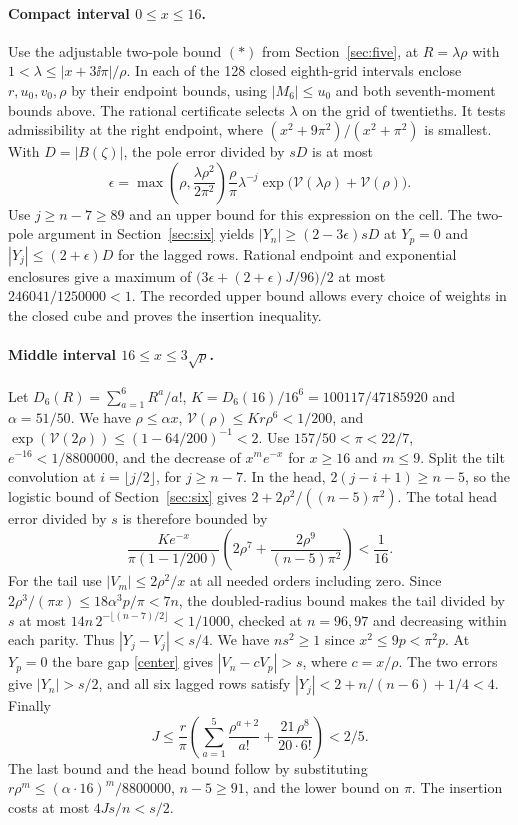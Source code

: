 \paragraph{Compact interval \(0\le x\le16\).}
Use the adjustable two-pole bound \((*)\) from Section~\ref{sec:five},
at \(R=\lambda\rho\) with \(1<\lambda\le|x+3\ii\pi|/\rho\).
In each of the 128 closed eighth-grid intervals enclose \(r,u_0,v_0,\rho\)
by their endpoint bounds, using \(|M_6|\le u_0\) and both seventh-moment
bounds above. The rational certificate selects \(\lambda\) on the
grid of twentieths. It tests admissibility at the right endpoint,
where \((x^2+9\pi^2)/(x^2+\pi^2)\) is smallest. With \(D=|B(\zeta)|\),
the pole error divided by \(sD\) is at most
\[
 \epsilon=\max\!\left(\rho,\frac{\lambda\rho^2}{2\pi^2}\right)
 \frac{\rho}{\pi}\lambda^{-j}
 \exp\!\bigl(\mathcal V(\lambda\rho)+\mathcal V(\rho)\bigr).
\]
Use \(j\ge n-7\ge89\) and an upper bound for this expression on the cell.
The two-pole argument in Section~\ref{sec:six} yields
\(|Y_n|\ge(2-3\epsilon)sD\) at \(Y_p=0\) and
\(|Y_j|\le(2+\epsilon)D\) for the lagged rows.
Rational endpoint and exponential enclosures give a maximum of
\(\bigl(3\epsilon+(2+\epsilon)J/96\bigr)/2\) at most
\(246041/1250000<1\). The recorded upper bound allows every choice of
weights in the closed cube and proves the insertion inequality.

\paragraph{Middle interval \(16\le x\le3\sqrt p\).}
Let \(D_6(R)=\sum_{a=1}^6 R^a/a!\), \(K=D_6(16)/16^6=100117/47185920\)
and \(\alpha=51/50\). We have \(\rho\le\alpha x\),
\(\mathcal V(\rho)\le Kr\rho^6<1/200\), and
\(\exp(\mathcal V(2\rho))\le(1-64/200)^{-1}<2\).
Use \(157/50<\pi<22/7\), \(e^{-16}<1/8800000\), and the decrease
of \(x^m e^{-x}\) for \(x\ge16\) and \(m\le9\).
Split the tilt convolution at \(i=\lfloor j/2\rfloor\), for \(j\ge n-7\).
In the head, \(2(j-i+1)\ge n-5\), so the logistic bound of
Section~\ref{sec:six} gives \(2+2\rho^2/((n-5)\pi^2)\).
The total head error divided by \(s\) is therefore bounded by
\[
 \frac{K e^{-x}}{\pi(1-1/200)}
       \left(2\rho^7+\frac{2\rho^9}{(n-5)\pi^2}\right)
 <\frac1{16}.
\]
For the tail use \(|V_m|\le2\rho^2/x\) at all needed orders including zero.
Since \(2\rho^3/(\pi x)\le18\alpha^3p/\pi<7n\),
the doubled-radius bound makes the tail divided by \(s\) at most
\(14n\,2^{-\lfloor(n-7)/2\rfloor}<1/1000\), checked at \(n=96,97\)
and decreasing within each parity. Thus \(|Y_j-V_j|<s/4\).
We have \(ns^2\ge1\) since \(x^2\le9p<\pi^2p\).
At \(Y_p=0\) the bare gap \eqref{center} gives \(|V_n-cV_p|>s\),
where \(c=x/\rho\). The two errors give \(|Y_n|>s/2\), and all six
lagged rows satisfy \(|Y_j|<2+n/(n-6)+1/4<4\). Finally
\[
 J\le\frac{r}{\pi}\left(\sum_{a=1}^{5}\frac{\rho^{a+2}}{a!}
                        +\frac{21\,\rho^8}{20\cdot6!}\right)<2/5 .
\]
The last bound and the head bound follow by substituting
\(r\rho^m\le(\alpha\cdot16)^m/8800000\), \(n-5\ge91\), and the lower
bound on \(\pi\). The insertion costs at most \(4Js/n<s/2\).

